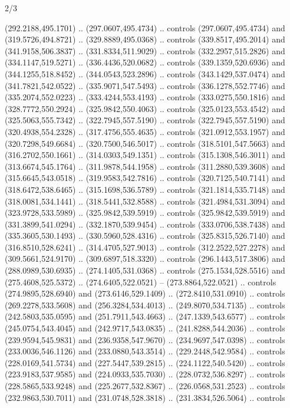 \begin{flagdescription}{2/3}
\begin{scope}[shift={(0.5\flaglength,0.5)},scale=\flagwidth/480]
\begin{scope}[y=0.8pt, x=0.8pt, yscale=-1,shift={(-450,-300)}]
\begin{scope}[cm={{0.4207,0.0,0.0,0.42106,(305.246,151.6454)}}]
\begin{scope}[cm={{2.15708,0.0,0.0,2.15708,(-419.5071,-975.3591)}}]
  (292.2188,495.1701) .. (297.0607,495.4734) .. controls (297.0607,495.4734) and
  (319.5726,494.8721) .. (329.8889,495.0368) .. controls (339.8517,495.2014) and
  (341.9158,506.3837) .. (331.8334,511.9029) .. controls (332.2957,515.2826) and
  (334.1147,519.5271) .. (336.4436,520.0682) .. controls (339.1359,520.6936) and
  (344.1255,518.8452) .. (344.0543,523.2896) .. controls (343.1429,537.0474) and
  (341.7821,542.0522) .. (335.9071,547.5493) .. controls (336.1278,552.7746) and
  (335.2074,552.0223) .. (333.4244,553.4193) .. controls (333.0275,550.1816) and
  (328.7772,550.2924) .. (325.9842,550.4063) .. controls (325.0123,553.4542) and
  (325.5063,555.7342) .. (322.7945,557.5190) .. controls (322.7945,557.5190) and
  (320.4938,554.2328) .. (317.4756,555.4635) .. controls (321.0912,553.1957) and
  (320.7298,549.6684) .. (320.7500,546.5017) .. controls (318.5101,547.5663) and
  (316.2702,550.1661) .. (314.0303,549.1351) .. controls (315.1308,546.3011) and
  (313.6674,545.1764) .. (311.9878,544.1958) .. controls (311.2880,539.3608) and
  (315.6645,543.0518) .. (319.9583,542.7816) .. controls (320.7125,540.7141) and
  (318.6472,538.6465) .. (315.1698,536.5789) .. controls (321.1814,535.7148) and
  (318.0081,534.1441) .. (318.5441,532.8588) .. controls (321.4984,531.3094) and
  (323.9728,533.5989) .. (325.9842,539.5919) .. controls (325.9842,539.5919) and
  (331.3899,541.0294) .. (332.1870,539.9454) .. controls (333.0706,538.7438) and
  (335.3605,530.1493) .. (330.5960,528.4316) .. controls (325.8315,526.7140) and
  (316.8510,528.6241) .. (314.4705,527.9013) .. controls (312.2522,527.2278) and
  (309.5661,524.9170) .. (309.6897,518.3320) .. controls (296.1443,517.3806) and
  (288.0989,530.6935) .. (274.1405,531.0368) .. controls (275.1534,528.5516) and
  (275.4608,525.5372) .. (274.6405,522.0521) -- (273.8864,522.0521) .. controls
  (274.9895,528.6940) and (273.6146,529.1409) .. (272.8410,531.0910) .. controls
  (269.2278,533.5608) and (256.3284,534.4013) .. (249.8070,534.7135) .. controls
  (242.5803,535.0595) and (251.7911,543.4663) .. (247.1339,543.6577) .. controls
  (245.0754,543.4045) and (242.9717,543.0835) .. (241.8288,544.2036) .. controls
  (239.9594,545.9831) and (236.9358,547.9670) .. (234.9697,547.0398) .. controls
  (233.0036,546.1126) and (233.0880,543.3514) .. (229.2448,542.9584) .. controls
  (228.0169,541.5734) and (227.5447,539.2815) .. (224.1122,540.5420) .. controls
  (223.9183,537.9585) and (224.0933,535.7030) .. (228.0732,536.8297) .. controls
  (228.5865,533.9248) and (225.2677,532.8367) .. (226.0568,531.2523) .. controls
  (232.9863,530.7011) and (231.0748,528.3818) .. (231.3834,526.5064) .. controls

\end{scope}
\end{scope}
\end{scope}
\end{scope}
\end{flagdescription}
